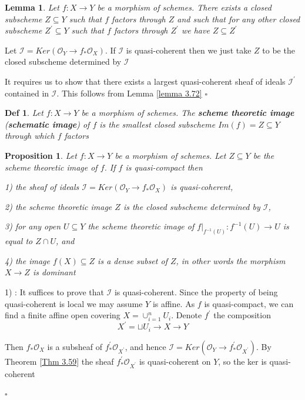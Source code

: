 \documentclass{article}
\newtheorem{definition}[theorem]{Def}
\newtheorem{lemma}[theorem]{Lemma}
\newtheorem{proposition}[theorem]{Proposition}
\newenvironment{Proof}{{\noindent \indent \it Proof:\quad}}{\hfill $\square$\par}
\begin{document}
\begin{lemma}
    Let $f:X\to Y$ be a morphism of schemes. There exists a closed subscheme $Z\subseteq Y$ such that $f$ factors through $Z$ and such that for any other closed subscheme $Z^\prime \subseteq Y$ such that $f$ factors through $Z^\prime$ we have $Z\subseteq Z^\prime$
\end{lemma}
\begin{Proof}
Let $\mathcal I=Ker(\mathcal O_Y \to f_\ast \mathcal O_X)$. If $\mathcal I$ is quasi-coherent then we just take $Z$ to be the closed subscheme determined by $\mathcal I$

It requires us to show that there exists a largest quasi-coherent sheaf of ideals $\mathcal I^\prime$ contained in $\mathcal I$. This follows from Lemma \ref{lemma 3.72}
\end{Proof}
\begin{definition}
    Let $f:X \to Y$ be a morphism of schemes. The \textbf{scheme theoretic image} (\textbf{schematic image}) of $f$ is the smallest closed subscheme $Im(f)=Z \subseteq Y$ through which $f$ factors
\end{definition}

\begin{proposition}
Let $f:X \to Y$ be a morphism of schemes. Let $Z \subseteq Y$ be the scheme theoretic image of $f$. If $f$ is quasi-compact then

1) the sheaf of ideals $\mathcal I=Ker(\mathcal O_Y \to f_\ast \mathcal O_X)$ is quasi-coherent,

2) the scheme theoretic image $Z$ is the closed subscheme determined by $\mathcal I$,

3) for any open $U\subseteq Y$ the scheme theoretic image of $f|_{f^{-1}(U)}:f^{-1}(U) \to U$ is equal to $Z \cap U$, and

4) the image $f(X) \subseteq Z$ is a dense subset of $Z$, in other words the morphism $X \to Z$ is dominant
\label{prop 3.79}
\end{proposition}
\begin{Proof}
1) : It suffices to prove that $\mathcal I$ is quasi-coherent. Since the property of being quasi-coherent is local we may assume $Y$ is affine. As $f$ is quasi-compact, we can find a finite affine open covering $X=\cup_{i=1}^n U_i$. Denote $f^\prime$ the composition
$$
X^\prime = \sqcup U_i \to X \to Y
$$

Then $f_\ast \mathcal O_X$ is a subsheaf of $f_\ast^\prime \mathcal O_{X^\prime}$, and hence $\mathcal I=Ker(\mathcal O_Y \to f_\ast^\prime \mathcal O_{X^\prime})$. By Theorem \ref{Thm 3.59} the sheaf $f_\ast^\prime \mathcal O_{X^\prime}$ is quasi-coherent on $Y$, so the ker is quasi-coherent

\end{Proof}
\end{document}
